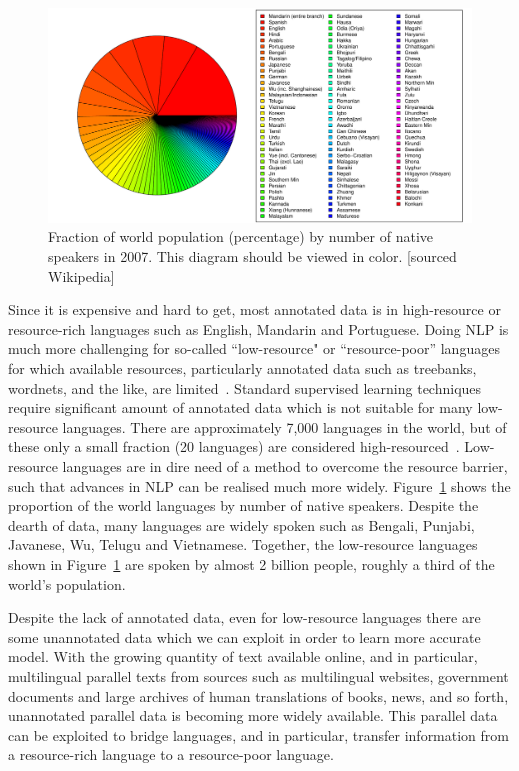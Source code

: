 \documentclass[12pt,twoside,final,hidelinks]{ltthesis}
\theoremstyle{definition}
\begin{document}
\begin{figure}
\centering
\includegraphics[scale=0.4]{Figures/ring_plot_languages}
\caption[Fraction of world population by number of native speakers]{Fraction of world population (percentage) by number of native speakers in 2007. This diagram should be viewed in color. [sourced Wikipedia]}
\label{fig:language_by_speakers}
\end{figure}
Since it is expensive and hard to get, most annotated data is in high-resource or resource-rich languages such as English, Mandarin and Portuguese. Doing NLP is much more challenging for so-called ``low-resource" or ``resource-poor'' languages for which available resources, particularly annotated data such as treebanks, wordnets, and the like, are limited~\cite{AbneyBird2010}. Standard supervised learning techniques require significant amount of annotated data which is not suitable for many low-resource languages. There are approximately 7,000 languages in the world, but of these only a small fraction (20 languages) are considered high-resourced~\cite{BAUMANN14}. 
Low-resource languages are in dire need of a method to overcome the resource barrier, such that advances in NLP can be realised much more widely. Figure~\ref{fig:language_by_speakers} shows the proportion of the world languages by number of native speakers. 
Despite the dearth of data, many languages are widely spoken such as Bengali, Punjabi, Javanese, Wu, Telugu and Vietnamese. Together, the low-resource languages shown in Figure~\ref{fig:language_by_speakers} %
are spoken by almost 2 billion people, roughly a third of the world's population. 

Despite the lack of annotated data, even for low-resource languages there are some unannotated data which we can exploit in order to learn more accurate model. With the growing 
quantity of text available online, and in particular, multilingual parallel texts from sources such as multilingual websites, government documents and large archives 
of human translations of books, news, and so forth, unannotated parallel data is becoming more widely available. This parallel data can be exploited to bridge 
languages, and in particular, transfer information from a resource-rich language to a resource-poor language. 
\end{document}
